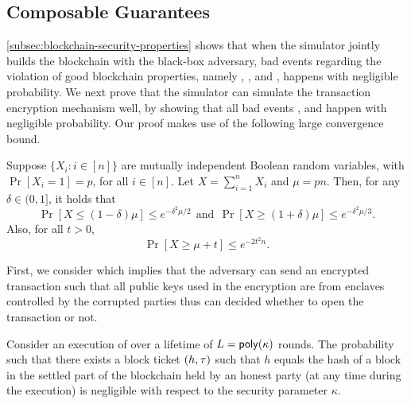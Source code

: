 \subsection{Composable Guarantees}
\label{subsec:composable-guarantees}

\cref{subsec:blockchain-security-properties} shows that when the simulator jointly builds the blockchain with the black-box adversary, bad events regarding the violation of good blockchain properties, namely \badCP, \badCQ, \badCG and \badProfile, happens with negligible probability.
%
We next prove that the simulator \simulator can simulate the transaction encryption mechanism well, by showing that all bad events \badTicket, \badNIZK and \badDec happen with negligible probability.
%
Our proof makes use of the following large convergence bound.

\begin{theorem}
	\label{thm:chernoff-bounds}

	Suppose $\{X_i: i \in [n]\}$ are mutually independent Boolean random variables, with $\Pr[X_i = 1] = p$, for all $i \in [n]$. Let $X =\sum^n_{i = 1} X_i$ and $\mu = pn$.
	Then, for any $\delta \in (0, 1]$, it holds that
	\[
		\Pr [X \le (1 - \delta) \mu] \le e^{- \delta^2 \mu / 2}
		~~\text{and}~~
		\Pr [X \ge (1 + \delta) \mu] \le e^{- \delta^2 \mu / 3}.
	\]
	Also, for all $t > 0$,
	\[ \Pr[X \ge \mu + t] \le e^{-2 t^2 n}. \]
\end{theorem}

First, we consider \badTicket which implies that the adversary \adv can send an encrypted transaction such that all public keys used in the encryption are from enclaves controlled by the corrupted parties thus \adv can decided whether to open the transaction or not.

\begin{lemma}
	\label{lemma:good-block-tickets}
	Consider an execution of \protocFairLedger over a lifetime of $L = \mathsf{poly}(\kappa)$ rounds.
	The probability such that there exists a block ticket $(h, \mathsf{\tau})$ such that $h$ equals the hash of a block in the settled part of the blockchain held by an honest party (at any time during the execution) is negligible with respect to the security parameter $\kappa$.
\end{lemma}

